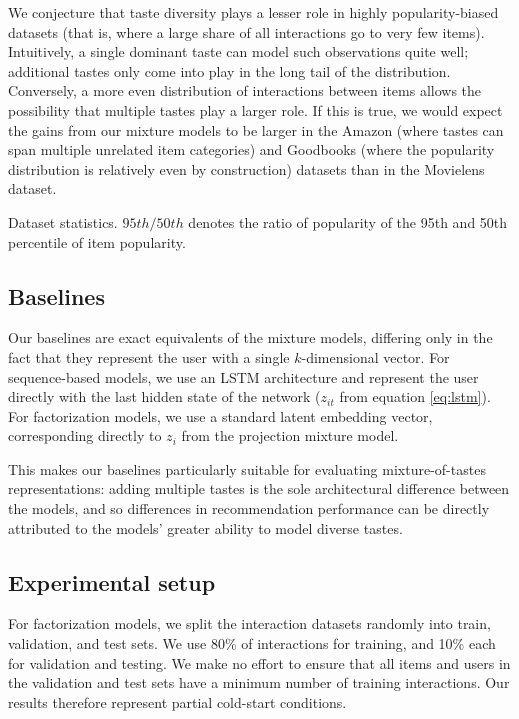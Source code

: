 \documentclass[sigchi]{acmart}
\begin{document}
We conjecture that taste diversity plays a lesser role in highly popularity-biased datasets (that is, where a large share of all interactions go to very few items). Intuitively, a single dominant taste can model such observations quite well; additional tastes only come into play in the long tail of the distribution. Conversely, a more even distribution of interactions between items allows the possibility that multiple tastes play a larger role. If this is true, we would expect the gains from our mixture models to be larger in the Amazon (where tastes can span multiple unrelated item categories) and Goodbooks (where the popularity distribution is relatively even by construction) datasets than in the Movielens dataset.

\begin{table}
  \caption{Dataset statistics. $95th/50th$ denotes the ratio of popularity of the 95th and 50th percentile of item popularity.}
  \label{tab:datasets}
  
\end{table}

\subsection{Baselines}
Our baselines are exact equivalents of the mixture models, differing only in the fact that they represent the user with a single $k$-dimensional vector. For sequence-based models, we use an LSTM architecture and represent the user directly with the last hidden state of the network ($z_{it}$ from equation \ref{eq:lstm}). For factorization models, we use a standard latent embedding vector, corresponding directly to $z_i$ from the projection mixture model.

This makes our baselines particularly suitable for evaluating mixture-of-tastes representations: adding multiple tastes is the sole architectural difference between the models, and so differences in recommendation performance can be directly attributed to the models' greater ability to model diverse tastes.

\subsection{Experimental setup}
For factorization models, we split the interaction datasets randomly into train, validation, and test sets. We use 80\% of interactions for training, and 10\% each for validation and testing. We make no effort to ensure that all items and users in the validation and test sets have a minimum number of training interactions. Our results therefore represent partial cold-start conditions.
\end{document}
